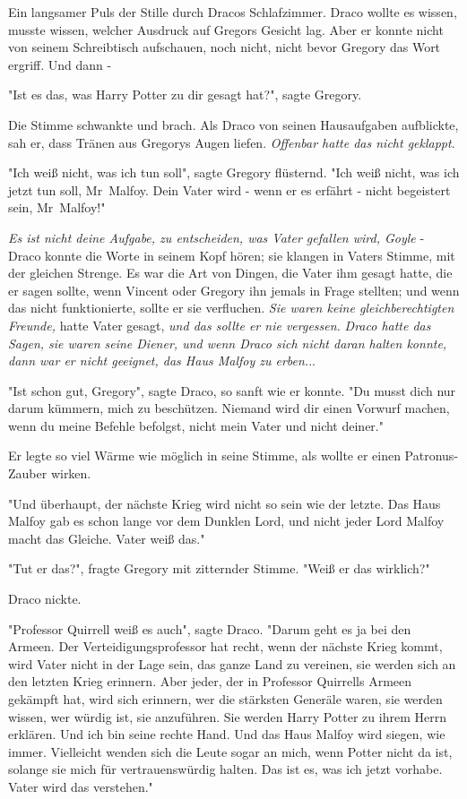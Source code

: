 {Ein langsamer Puls der Stille durch Dracos Schlafzimmer. Draco wollte es wissen, musste wissen, welcher Ausdruck auf Gregors Gesicht lag. Aber er konnte nicht von seinem Schreibtisch aufschauen, noch nicht, nicht bevor Gregory das Wort ergriff. Und dann -

"Ist es das, was Harry Potter zu dir gesagt hat?", sagte Gregory.

Die Stimme schwankte und brach. Als Draco von seinen Hausaufgaben aufblickte, sah er, dass Tränen aus Gregorys Augen liefen. \emph{Offenbar hatte das nicht geklappt}.

"Ich weiß nicht, was ich tun soll", sagte Gregory flüsternd. "Ich weiß nicht, was ich jetzt tun soll, Mr~Malfoy. Dein Vater wird - wenn er es erfährt - nicht begeistert sein, Mr~Malfoy!"

\emph{Es ist nicht deine Aufgabe, zu entscheiden, was Vater gefallen wird, Goyle} - Draco konnte die Worte in seinem Kopf hören; sie klangen in Vaters Stimme, mit der gleichen Strenge. Es war die Art von Dingen, die Vater ihm gesagt hatte, die er sagen sollte, wenn Vincent oder Gregory ihn jemals in Frage stellten; und wenn das nicht funktionierte, sollte er sie verfluchen. \emph{Sie waren keine gleichberechtigten Freunde,} hatte Vater gesagt, \emph{und das sollte er nie vergessen.} \emph{Draco hatte das Sagen, sie waren seine Diener, und wenn Draco sich nicht daran halten konnte, dann war er nicht geeignet, das Haus Malfoy zu erben.}..

"Ist schon gut, Gregory", sagte Draco, so sanft wie er konnte. "Du musst dich nur darum kümmern, mich zu beschützen. Niemand wird dir einen Vorwurf machen, wenn du meine Befehle befolgst, nicht mein Vater und nicht deiner."

Er legte so viel Wärme wie möglich in seine Stimme, als wollte er einen Patronus-Zauber wirken.

"Und überhaupt, der nächste Krieg wird nicht so sein wie der letzte. Das Haus Malfoy gab es schon lange vor dem Dunklen Lord, und nicht jeder Lord Malfoy macht das Gleiche. Vater weiß das."

"Tut er das?", fragte Gregory mit zitternder Stimme. "Weiß er das wirklich?"

Draco nickte.

"Professor Quirrell weiß es auch", sagte Draco. "Darum geht es ja bei den Armeen. Der Verteidigungsprofessor hat recht, wenn der nächste Krieg kommt, wird Vater nicht in der Lage sein, das ganze Land zu vereinen, sie werden sich an den letzten Krieg erinnern. Aber jeder, der in Professor Quirrells Armeen gekämpft hat, wird sich erinnern, wer die stärksten Generäle waren, sie werden wissen, wer würdig ist, sie anzuführen. Sie werden Harry Potter zu ihrem Herrn erklären. Und ich bin seine rechte Hand. Und das Haus Malfoy wird siegen, wie immer. Vielleicht wenden sich die Leute sogar an mich, wenn Potter nicht da ist, solange sie mich für vertrauenswürdig halten. Das ist es, was ich jetzt vorhabe. Vater wird das verstehen."

}
